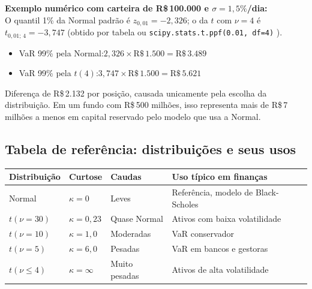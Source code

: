 \documentclass[11pt,a4paper]{article}
\newcommand{\code}[1]{%
  \colorbox{quantlightgray}{\texttt{\small\color{quantdark}#1}}%
}
\theoremstyle{quant}
\begin{document}
\begin{highlightbox}
  \textbf{Exemplo numérico com carteira de R\$\,100.000 e $\sigma = 1{,}5\%$/dia:}\\[4pt]
  O quantil 1\% da Normal padrão é $z_{0{,}01} = -2{,}326$; o da $t$ com $\nu = 4$
  é $t_{0{,}01;\,4} = -3{,}747$ (obtido por tabela ou \code{scipy.stats.t.ppf(0.01, df=4)}).
  \begin{itemize}
    \item VaR 99\% pela Normal:\quad $2{,}326 \times \text{R\$}\,1.500 = \text{R\$}\,3.489$
    \item VaR 99\% pela $t(4)$:\quad $3{,}747 \times \text{R\$}\,1.500 = \text{R\$}\,5.621$
  \end{itemize}
  Diferença de R\$\,2.132 por posição, causada unicamente pela escolha da distribuição.
  Em um fundo com R\$\,500 milhões, isso representa mais de R\$\,7 milhões a menos em
  capital reservado pelo modelo que usa a Normal.
\end{highlightbox}

\subsection{Tabela de referência: distribuições e seus usos}

\vspace{0.4em}
\begin{center}
\begin{tabular}{@{}lp{2.2cm}p{2.5cm}p{5.5cm}@{}}
\toprule
\textcolor{quantpurple}{\textbf{Distribuição}} &
\textcolor{quantpurple}{\textbf{Curtose}} &
\textcolor{quantpurple}{\textbf{Caudas}} &
\textcolor{quantpurple}{\textbf{Uso típico em finanças}} \\
\midrule
Normal          & $\kappa = 0$      & Leves         & Referência, modelo de Black-Scholes \\[4pt]
$t(\nu = 30)$   & $\kappa = 0{,}23$ & Quase Normal  & Ativos com baixa volatilidade \\[4pt]
$t(\nu = 10)$   & $\kappa = 1{,}0$  & Moderadas     & VaR conservador \\[4pt]
$t(\nu = 5)$    & $\kappa = 6{,}0$  & Pesadas       & VaR em bancos e gestoras \\[4pt]
$t(\nu \leq 4)$ & $\kappa = \infty$ & Muito pesadas & Ativos de alta volatilidade \\
\bottomrule
\end{tabular}
\end{center}
\end{document}

